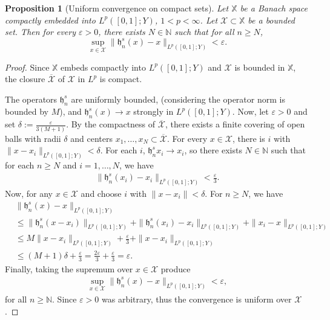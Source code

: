 \documentclass[english,a4paper,11pt]{amsart}
\theoremstyle{plain}
\newtheorem{proposition}[theorem]{Proposition}
\theoremstyle{definition}
\theoremstyle{remark}
\numberwithin{equation}{section}
\newcommand{\N}{\mathbb{N}}
\begin{document}
\begin{appendix}
\begin{proposition}[Uniform convergence on compact sets]\label{prop:haar-uniform}
Let $\mathbb{X}$ be a Banach space compactly embedded into $L^p([0,1];Y)$, $1<p<\infty$. Let $\mathcal{X} \subset \mathbb{X}$ be a bounded set. Then for every $\varepsilon>0$, there exists $N \in \mathbb{N}$ such that for all $n \geq N$,
\[
\sup_{x \in \mathcal{X}} \| \mathfrak{h}_n^s(x) - x \|_{L^p([0,1];Y)} <\varepsilon.
\]
\end{proposition}

\begin{proof}
Since $\mathbb{X}$ embeds compactly into $L^p([0,1];Y)$ and $\mathcal{X}$ is bounded in $\mathbb{X}$, the closure $\overline{\mathcal{X}}$ of $\mathcal{X}$ in $L^p$ is compact.

{
The operators $\mathfrak{h}_n^s$ are uniformly bounded, (considering the operator norm is bounded by $M$), and  $\mathfrak{h}_n^s(x) \to x$ strongly in $L^p([0,1];Y)$.  
Now, let $\varepsilon>0$ and set $\delta:=\frac{\varepsilon}{3(M+1)}$. By the compactness of $\overline{\mathcal{X}}$, there exists a finite covering of open balls with radii $\delta$ and centers ${x_1, \ldots,x_N}\subset \overline{\mathcal{X}}$. For every $x\in \mathcal{X}$, there is $i$ with $\|x-x_i\|_{L^p([0,1];Y)}<\delta$. For each $i$, $\mathfrak{h}_n^s x_i \to x_i$, so there exists $N\in\N$ such that for each $n\geq N$ and $i=1,\ldots ,N$, we have
\begin{align*}
	\| \mathfrak{h}_n^s(x_i) - x_i \|_{L^p([0,1];Y)} <\frac{\varepsilon}{3}.
\end{align*} Now, for any $x\in \mathcal{X}$ and choose $i$ with $\|x-x_i\|<\delta$. For $n\geq N$, we have
\begin{align*}
&	\|\mathfrak{h}_n^s(x)-x\|_{L^p([0,1];Y)} 
\\&	\leq 	\|\mathfrak{h}_n^s(x-x_i)\|_{L^p([0,1];Y)}+ \|\mathfrak{h}_n^s(x_i)-x_i\|_{L^p([0,1];Y)}+\|x_i-x\|_{L^p([0,1];Y)}
\\&  \leq M \|x-x_i\|_{L^p([0,1];Y)}+\frac{\varepsilon}{3}+\|x-x_i\|_{L^p([0,1];Y)} 
\\&\leq (M+1)\delta+\frac{\varepsilon}{3} = \frac{2\varepsilon}{3}+\frac{\varepsilon}{3} = \varepsilon. 
\end{align*}Finally, taking the supremum over $x\in \mathcal{X}$ produce 
\begin{align*}
	\sup_{x \in \mathcal{X}} \| \mathfrak{h}_n^s(x) - x \|_{L^p([0,1];Y)} < \varepsilon,
\end{align*}for all $n\geq \N$. Since $\varepsilon>0$ was arbitrary, thus the convergence is uniform over $\mathcal{X}$.}
\end{proof}



\end{appendix}
\end{document}
